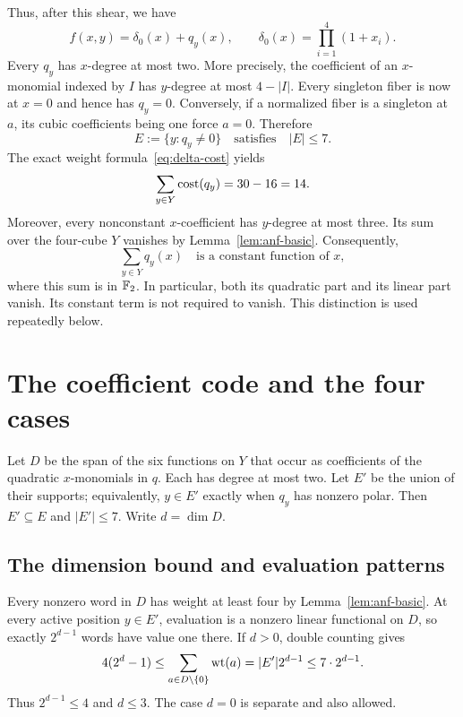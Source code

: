 Thus, after this shear, we have
\begin{equation}\label{eq:normalized}
f(x,y)=\delta_0(x)+q_y(x),\qquad
\delta_0(x)=\prod_{i=1}^4(1+x_i).
\end{equation}
Every $q_y$ has $x$-degree at most two. More precisely, the coefficient of an $x$-monomial indexed by $I$ has $y$-degree at most $4-|I|$. Every singleton fiber is now at $x=0$ and hence has $q_y=0$. Conversely, if a normalized fiber is a singleton at $a$, its cubic coefficients being one force $a=0$. Therefore
\begin{equation}\label{eq:active-bound}
E:=\{y:q_y\ne0\}\quad\text{satisfies}\quad |E|\le7.
\end{equation}
The exact weight formula~\eqref{eq:delta-cost} yields
\begin{equation}\label{eq:cost-fourteen}
\sum_{y\in Y}\operatorname{cost}(q_y)=30-16=14.
\end{equation}
Moreover, every nonconstant $x$-coefficient has $y$-degree at most three. Its sum over the four-cube $Y$ vanishes by Lemma~\ref{lem:anf-basic}. Consequently,
\begin{equation}\label{eq:constant-sum}
\sum_{y\in Y}q_y(x)\quad\text{is a constant function of }x,
\end{equation}
where this sum is in $\mathbb F_2$. In particular, both its quadratic part and its linear part vanish. Its constant term is not required to vanish. This distinction is used repeatedly below.

\section{The coefficient code and the four cases}\label{sec:classify}
Let $D$ be the span of the six functions on $Y$ that occur as coefficients of the quadratic $x$-monomials in $q$. Each has degree at most two. Let $E'$ be the union of their supports; equivalently, $y\in E'$ exactly when $q_y$ has nonzero polar. Then $E'\subseteq E$ and $|E'|\le7$. Write $d=\dim D$.

\subsection{The dimension bound and evaluation patterns}
Every nonzero word in $D$ has weight at least four by Lemma~\ref{lem:anf-basic}. At every active position $y\in E'$, evaluation is a nonzero linear functional on $D$, so exactly $2^{d-1}$ words have value one there. If $d>0$, double counting gives
\begin{equation}\label{eq:code-count}
4(2^d-1)\le\sum_{a\in D\setminus\{0\}}\operatorname{wt}(a)
=|E'|2^{d-1}\le7\cdot2^{d-1}.
\end{equation}
Thus $2^{d-1}\le4$ and $d\le3$. The case $d=0$ is separate and also allowed.

